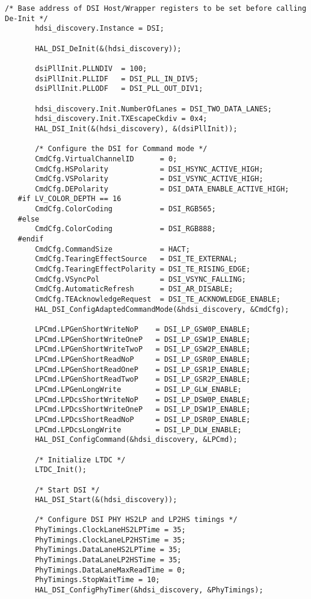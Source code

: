 \begin{lstlisting}[captionpos=t, caption={Fichero \texttt{tft.c}}]
       /* Base address of DSI Host/Wrapper registers to be set before calling De-Init */
       hdsi_discovery.Instance = DSI;
   
       HAL_DSI_DeInit(&(hdsi_discovery));
   
       dsiPllInit.PLLNDIV  = 100;
       dsiPllInit.PLLIDF   = DSI_PLL_IN_DIV5;
       dsiPllInit.PLLODF   = DSI_PLL_OUT_DIV1;
   
       hdsi_discovery.Init.NumberOfLanes = DSI_TWO_DATA_LANES;
       hdsi_discovery.Init.TXEscapeCkdiv = 0x4;
       HAL_DSI_Init(&(hdsi_discovery), &(dsiPllInit));
   
       /* Configure the DSI for Command mode */
       CmdCfg.VirtualChannelID      = 0;
       CmdCfg.HSPolarity            = DSI_HSYNC_ACTIVE_HIGH;
       CmdCfg.VSPolarity            = DSI_VSYNC_ACTIVE_HIGH;
       CmdCfg.DEPolarity            = DSI_DATA_ENABLE_ACTIVE_HIGH;
   #if LV_COLOR_DEPTH == 16
       CmdCfg.ColorCoding           = DSI_RGB565;
   #else
       CmdCfg.ColorCoding           = DSI_RGB888;
   #endif
       CmdCfg.CommandSize           = HACT;
       CmdCfg.TearingEffectSource   = DSI_TE_EXTERNAL;
       CmdCfg.TearingEffectPolarity = DSI_TE_RISING_EDGE;
       CmdCfg.VSyncPol              = DSI_VSYNC_FALLING;
       CmdCfg.AutomaticRefresh      = DSI_AR_DISABLE;
       CmdCfg.TEAcknowledgeRequest  = DSI_TE_ACKNOWLEDGE_ENABLE;
       HAL_DSI_ConfigAdaptedCommandMode(&hdsi_discovery, &CmdCfg);
   
       LPCmd.LPGenShortWriteNoP    = DSI_LP_GSW0P_ENABLE;
       LPCmd.LPGenShortWriteOneP   = DSI_LP_GSW1P_ENABLE;
       LPCmd.LPGenShortWriteTwoP   = DSI_LP_GSW2P_ENABLE;
       LPCmd.LPGenShortReadNoP     = DSI_LP_GSR0P_ENABLE;
       LPCmd.LPGenShortReadOneP    = DSI_LP_GSR1P_ENABLE;
       LPCmd.LPGenShortReadTwoP    = DSI_LP_GSR2P_ENABLE;
       LPCmd.LPGenLongWrite        = DSI_LP_GLW_ENABLE;
       LPCmd.LPDcsShortWriteNoP    = DSI_LP_DSW0P_ENABLE;
       LPCmd.LPDcsShortWriteOneP   = DSI_LP_DSW1P_ENABLE;
       LPCmd.LPDcsShortReadNoP     = DSI_LP_DSR0P_ENABLE;
       LPCmd.LPDcsLongWrite        = DSI_LP_DLW_ENABLE;
       HAL_DSI_ConfigCommand(&hdsi_discovery, &LPCmd);
   
       /* Initialize LTDC */
       LTDC_Init();
   
       /* Start DSI */
       HAL_DSI_Start(&(hdsi_discovery));
   
       /* Configure DSI PHY HS2LP and LP2HS timings */
       PhyTimings.ClockLaneHS2LPTime = 35;
       PhyTimings.ClockLaneLP2HSTime = 35;
       PhyTimings.DataLaneHS2LPTime = 35;
       PhyTimings.DataLaneLP2HSTime = 35;
       PhyTimings.DataLaneMaxReadTime = 0;
       PhyTimings.StopWaitTime = 10;
       HAL_DSI_ConfigPhyTimer(&hdsi_discovery, &PhyTimings);
   

\end{lstlisting}

